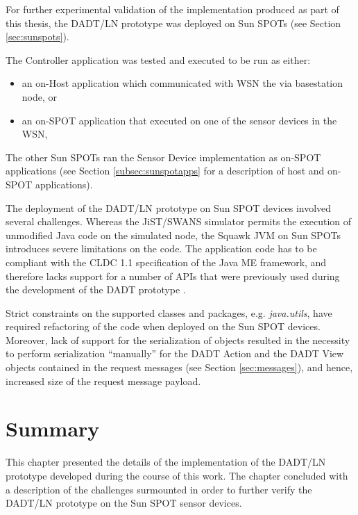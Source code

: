 For further experimental validation of the implementation produced as part of 
this thesis, the DADT/LN prototype was deployed on Sun SPOTs
\cite{simon_squawk:2006} (see Section \ref{sec:sunspots}).

The Controller application was tested and executed to be run as either:
\begin{itemize}
  \item an on-Host application which communicated with WSN the via basestation node, or 
  \item an on-SPOT application that executed on one of the sensor devices in the WSN, 
\end{itemize}
The other Sun SPOTs ran the Sensor Device implementation as on-SPOT applications
(see Section \ref{subsec:sunspotapps} for a description of host and on-SPOT
applications).

The deployment of the DADT/LN prototype on Sun SPOT devices involved several
challenges. Whereas the JiST/SWANS simulator permits the execution of unmodified Java code
on the simulated node, the Squawk JVM on Sun SPOTs introduces severe limitations
on the code. The application code has to be compliant with the CLDC 1.1 specification
of the Java ME framework, and therefore lacks support for a number of APIs that were
previously used during the development of the DADT prototype \cite{migliavacca_DADT:2006}.

Strict constraints on the supported classes and packages,
e.g. \emph{java.utils}, have required refactoring of the code when deployed
on the Sun SPOT devices. Moreover, lack of support for the serialization of objects resulted in the
necessity to perform serialization ``manually'' for the DADT Action
and the DADT View objects contained in the request messages (see Section
\ref{sec:messages}), and hence, increased size of the request message payload.

\section{Summary}

This chapter presented the details of the implementation of the DADT/LN
prototype developed during the course of this work. The chapter
concluded with a description of the challenges surmounted in order to
further verify the DADT/LN prototype on the Sun SPOT sensor devices.
